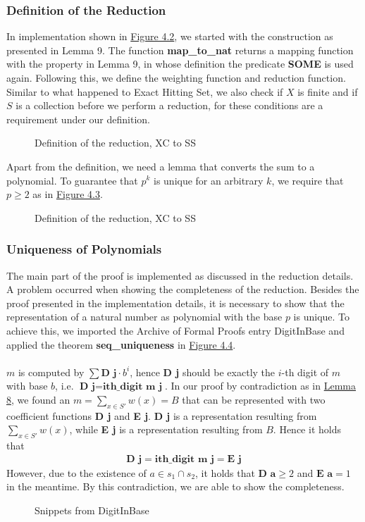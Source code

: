 \subsubsection{Definition of the Reduction}
In implementation shown in \hyperref[fig:4.2]{Figure 4.2}, we started with the construction as presented in Lemma 9. The function \textbf{map\_to\_nat} returns 
a mapping function with the property in Lemma 9, in whose definition the predicate \textbf{SOME} is used again.
Following this, we define the weighting function and reduction function. 
Similar to what happened to Exact Hitting Set, we also check if $X$ is finite and if $S$ is 
a collection before we perform a reduction, for these conditions are a requirement under our definition. 
\begin{figure}[!h]
    \caption{Definition of the reduction, XC to SS}
    \label{fig:4.2}
\end{figure}
Apart from the definition, we need a lemma that converts the sum to a polynomial. To guarantee that $p^k$ is unique for an arbitrary $k$, 
we require that $p \geq 2$ as in \hyperref[fig:4.3]{Figure 4.3}.
\begin{figure}[!h]
    \caption{Definition of the reduction, XC to SS}
    \label{fig:4.3}
\end{figure}

\subsubsection{Uniqueness of Polynomials}
The main part of the proof is implemented as discussed in the reduction details. A problem occurred when showing the completeness of the reduction. 
Besides the proof presented in the implementation details, it is necessary to show that the representation of a natural number as
polynomial with the base $p$ is unique. To achieve this, we imported the Archive of Formal Proofs entry DigitInBase and applied the theorem \textbf{seq\_uniqueness}
in \hyperref[fig:4.4]{Figure 4.4}.\\\\
$m$ is computed by $\sum \textbf{D j} \cdot b^i$, hence \textbf{D j} should be exactly the $i$-th 
digit of $m$ with base $b$, i.e. $\textbf{D j} = \textbf{ith\_digit m j}$. 
In our proof by contradiction as in \hyperref[lemma:sscompl]{Lemma 8}, 
we found an $m = \sum_{x \in S'} w(x) = B$ that can be represented with two coefficient functions \textbf{D j} and \textbf{E j}. 
\textbf{D j} is a representation resulting from $\sum_{x \in S'} w(x)$, 
while \textbf{E j} is a representation resulting from $B$.
Hence it holds that 
\begin{align*}
    \textbf{D j} = \textbf{ith\_digit m j} = \textbf{E j}
\end{align*}
However, due to the existence of $a \in s_1 \cap s_2$, it holds that $\textbf{D a} \geq 2$ and $\textbf{E a} = 1$ in the meantime. 
By this contradiction, we are able to show the completeness.
\begin{figure}[!h]
    \caption{Snippets from DigitInBase}
    \label{fig:4.4}
\end{figure}
